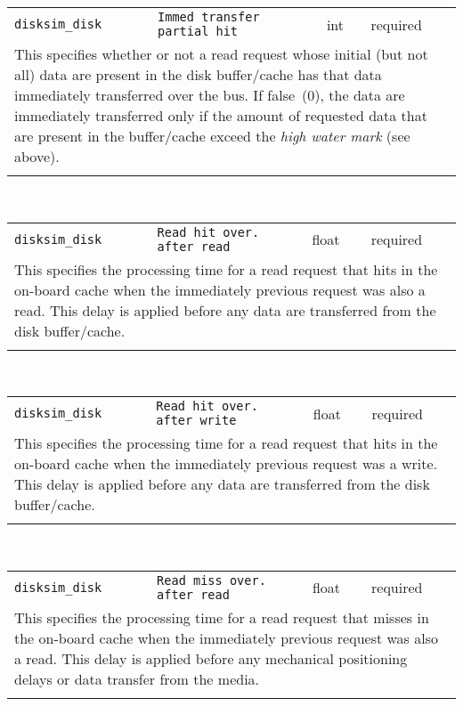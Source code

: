 \noindent 
\begin{tabular}{|p{1.5in}|p{3.5in}|p{0.5in}|p{0.5in}|}
\cline{1-4}
\texttt{disksim\_disk} & \texttt{Immed transfer partial hit} & int & required \\ 
\cline{1-4}
\multicolumn{4}{|p{6in}|}{
This specifies whether or not a read request whose initial (but not all)
data are present in the disk buffer/cache has that data immediately
transferred over the bus. If false~(0), the data are immediately
transferred only if the amount of requested data that are present in
the buffer/cache exceed the {\it high water mark} (see above).
}\\ 
\cline{1-4}
\multicolumn{4}{p{5in}}{}\\
\end{tabular}\\ 
\noindent 
\begin{tabular}{|p{1.5in}|p{3.5in}|p{0.5in}|p{0.5in}|}
\cline{1-4}
\texttt{disksim\_disk} & \texttt{Read hit over. after read} & float & required \\ 
\cline{1-4}
\multicolumn{4}{|p{6in}|}{
This specifies the processing time for a read request that hits in the
on-board cache when the immediately previous request was also a read.
This delay is applied before any data are transferred from the disk
buffer/cache.
}\\ 
\cline{1-4}
\multicolumn{4}{p{5in}}{}\\
\end{tabular}\\ 
\noindent 
\begin{tabular}{|p{1.5in}|p{3.5in}|p{0.5in}|p{0.5in}|}
\cline{1-4}
\texttt{disksim\_disk} & \texttt{Read hit over. after write} & float & required \\ 
\cline{1-4}
\multicolumn{4}{|p{6in}|}{
This specifies the processing time for a read request that hits in the
on-board cache when the immediately previous request was a write.
This delay is applied before any data are transferred from the disk
buffer/cache.
}\\ 
\cline{1-4}
\multicolumn{4}{p{5in}}{}\\
\end{tabular}\\ 
\noindent 
\begin{tabular}{|p{1.5in}|p{3.5in}|p{0.5in}|p{0.5in}|}
\cline{1-4}
\texttt{disksim\_disk} & \texttt{Read miss over. after read} & float & required \\ 
\cline{1-4}
\multicolumn{4}{|p{6in}|}{
This specifies the processing time for a read request that misses in the
on-board cache when the immediately previous request was also a read.
This delay is applied before any mechanical positioning delays or data
transfer from the media.
}\\ 
\cline{1-4}
\multicolumn{4}{p{5in}}{}\\
\end{tabular}\\ 
